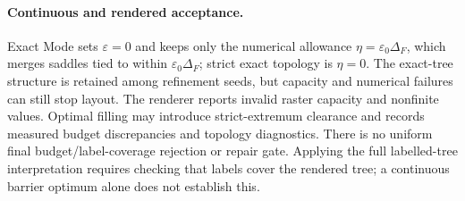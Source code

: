 \documentclass[preprint]{vgtc}   %
\begin{document}
\paragraph{Continuous and rendered acceptance.}
Exact Mode sets $\varepsilon=0$ and keeps only the numerical allowance $\eta=\varepsilon_0\Delta_F$, which merges saddles tied to within $\varepsilon_0\Delta_F$; strict exact topology is $\eta=0$. The exact-tree structure is retained among refinement seeds, but capacity and numerical failures can still stop layout. The renderer reports invalid raster capacity and nonfinite values. Optimal filling may introduce strict-extremum clearance and records measured budget discrepancies and topology diagnostics. There is no uniform final budget/label-coverage rejection or repair gate. Applying the full labelled-tree interpretation requires checking that labels cover the rendered tree; a continuous barrier optimum alone does not establish this.
\end{document}
